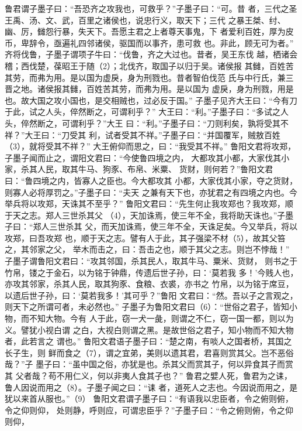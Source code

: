 \documentclass[12pt,UTF8]{ctexbook}
\begin{document}
鲁君谓子墨子曰：“吾恐齐之攻我也，可救乎？”子墨子曰：“可。昔 
者，三代之圣王禹、汤、文、武，百里之诸侯也，说忠行义，取天下；三代 
之暴王桀、纣、幽、厉，雠怨行暴，失天下。吾愿主君之上者尊天事鬼，下 
者爱利百姓，厚为皮币，卑辞令，亟遍礼四邻诸侯，驱国而以事齐，患可救 
也。非此，顾无可为者。” 
齐将伐鲁，子墨子谓项子牛曰：“伐鲁，齐之大过也。昔者，吴王东伐 
越，栖诸会稽；西伐楚，葆昭王于随（2）；北伐齐，取国子以归于吴。诸侯报 
其雠，百姓苦其劳，而弗为用。是以国为虚戾，身为刑戮也。昔者智伯伐范 
氏与中行氏，兼三晋之地。诸侯报其雠，百姓苦其劳，而弗为用。是以国为 
虚戾，身为刑戮，用是也。故大国之攻小国也，是交相贼也，过必反于国。” 
子墨子见齐大王曰：“今有刀于此，试之人头，倅然断之，可谓利乎？” 
大王曰：“利。”子墨子曰：“多试之人头，倅然断之，可谓利乎？”大王 
曰：“利。”子墨子曰：“刀则利矣，孰将受其不祥？”大王曰：“刀受其 
利，试者受其不祥。”子墨子曰：“并国覆军，贼敖百姓（3），就将受其不祥？” 
大王俯仰而思之，曰：“我受其不祥。” 
鲁阳文君将攻郑，子墨子闻而止之，谓阳文君曰：“今使鲁四境之内， 
大都攻其小都，大家伐其小家，杀其人民，取其牛马、狗豕、布帛、米粟、 
货财，则何若？”鲁阳文君曰：“鲁四境之内，皆寡人之臣也。今大都攻其 
小都，大家伐其小家，夺之货财，则寡人必将厚罚之。”子墨子曰：“夫天 
之兼有天下也，亦犹君之有四境之内也。今举兵将以攻郑，天诛其不至乎？” 
鲁阳文君曰：“先生何止我攻郑也？我攻郑，顺于天之志。郑人三世杀其父 
（4），天加诛焉，使三年不全，我将助天诛也。”子墨子曰：“郑人三世杀其 
父，而天加诛焉，使三年不全，天诛足矣。今又举兵，将以攻郑，曰吾攻郑 
也，顺于天之志。譬有人于此，其子强梁不材（5），故其父笞之，其邻家之父， 
举木而击之，曰：吾击之也，顺于其父之志。则岂不悖哉！” 
子墨子谓鲁阳文君曰：“攻其邻国，杀其民人，取其牛马、粟米、货财， 
则书之于竹帛，镂之于金石，以为铭于钟鼎，传遗后世子孙，曰：‘莫若我 
多！’今贱人也，亦攻其邻家，杀其人民，取其狗豕、食粮、衣裘，亦书之 
竹帛，以为铭于席豆，以遗后世子孙，曰：‘莫若我多！’其可乎？”鲁阳 
文君曰：“然。吾以子之言观之，则天下之所谓可者，未必然也。” 
子墨子为鲁阳文君曰（6）：“世俗之君子，皆知小物，而不知大物。今有 
人于此，窃一犬一彘，则谓之不仁，窃一国一都，则以为义。譬犹小视白谓 
之白，大视白则谓之黑。是故世俗之君子，知小物而不知大物者，此若言之 
谓也。” 
鲁阳文君语子墨子曰：“楚之南，有啖人之国者桥，其国之长子生，则 
鲜而食之（7），谓之宜弟，美则以遗其君，君喜则赏其父。岂不恶俗哉？”子 
墨子曰：“虽中国之俗，亦犹是也。杀其父而赏其子，何以异食其子而赏其 
父者哉？苟不用仁义，何以非夷人食其子也？” 
鲁君之嬖人死，鲁君为之诔，鲁人因说而用之（8）。子墨子闻之曰：“诔 
者，道死人之志也。今因说而用之，是犹以来首从服也。”（9） 
鲁阳文君谓子墨子曰：“有语我以忠臣者，令之俯则俯，令之仰则仰， 
处则静，呼则应，可谓忠臣乎？”子墨子曰：“令之俯则俯，令之仰则仰， 
\end{document}
